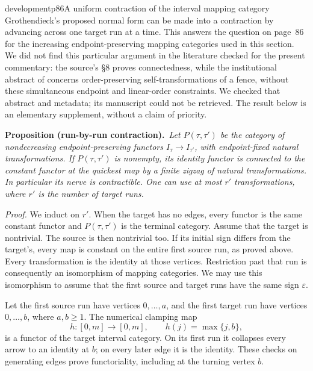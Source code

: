 \begin{dcomment}{development}{p86}{A uniform contraction of the interval mapping category}
Grothendieck's proposed normal form can be made into a contraction by advancing across one target run at a time. This answers the question on page~86 for the increasing endpoint-preserving mapping categories used in this section. We did not find this particular argument in the literature checked for the present commentary: the source's \S8 proves connectedness, while the institutional abstract of \citet{FernandesKoppitzMusunthia2019} concerns order-preserving self-transformations of a fence, without these simultaneous endpoint and linear-order constraints. We checked that abstract and metadata; its manuscript could not be retrieved. The result below is an elementary supplement, without a claim of priority.

\textbf{Proposition (run-by-run contraction).}\ours\
\textit{Let $P(\tau,\tau')$ be the category of nondecreasing endpoint-preserving functors $I_\tau\to I_{\tau'}$, with endpoint-fixed natural transformations. If $P(\tau,\tau')$ is nonempty, its identity functor is connected to the constant functor at the quickest map by a finite zigzag of natural transformations. In particular its nerve is contractible. One can use at most $r'$ transformations, where $r'$ is the number of target runs.}

\textit{Proof.} We induct on $r'$. When the target has no edges, every functor is the same constant functor and $P(\tau,\tau')$ is the terminal category. Assume that the target is nontrivial. The source is then nontrivial too. If its initial sign differs from the target's, every map is constant on the entire first source run, as proved above. Every transformation is the identity at those vertices. Restriction past that run is consequently an isomorphism of mapping categories. We may use this isomorphism to assume that the first source and target runs have the same sign $\varepsilon$.

Let the first source run have vertices $0,\ldots,a$, and the first target run have vertices $0,\ldots,b$, where $a,b\geq1$. The numerical clamping map
\[
 h:[0,m]\longrightarrow[0,m],\qquad h(j)=\max\{j,b\},
\]
is a functor of the target interval category. On its first run it collapses every arrow to an identity at $b$; on every later edge it is the identity. These checks on generating edges prove functoriality, including at the turning vertex $b$.


\end{dcomment}
